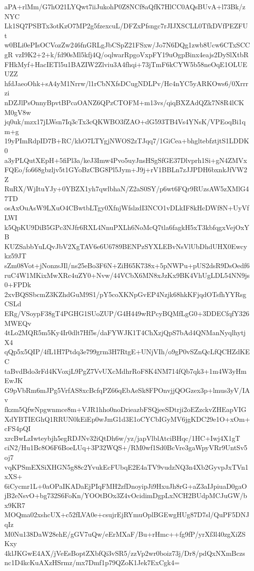 aPA+rlMm/G7hO21LYQwt7iiJukohP0Z8NCf8aQfK7HlCC0AQsBUvA+l73Bk/zNYC
Lk1SQ7PSBTx3otKzO7MP2g5fzexcuL/DFZxPfsngc7rJIJXSCLL0TfkDVfPEZFUt
w0BLi0ePIsOCVozZw246fnGRLgJbCSpZ21FSxw/Jo7N6DQg1zwb8Ucw6CTxSCCgR
vzI9K2+2+k/fd90sMl5kfj4Q/oqlwarRpgoVxpFY19uOgpBinx4eajs2DySlXtbR
FHkMyf+HacIETl5u1BAZIW2Zlviu3A4fhqi+73jTmF6kCYW5b58neOqE1OLUEUZZ
hfdJaeoOhk+sA4yM1Nrrw/l1rCbNXfsDCugNDLPv/Hc4nYC5yARKOws6/0Xrrrzi
nDZJlPsOnnyBpvtBPcaOANZ6QPzCTOFM+m13vs/qiqBXZAdQZk7N8R4lCKM0gV8w
jq0uk/mzx17jLWsn7Iq3cTx3cQKWBO3fZAO+dG593TB4Vs4YNsK/VPEoqBi1qm+g
19yPImRdpID7B+RC/khO7LTYgjNWOS2zTJqq7/1GiCea+bhgltebfztjtS1LDDK0
a3yPLQutXEpH+5fiPl3a/keJ3Imw4Pvo5uyJnsHSgSfGE37Dlvprh1Si+gN4ZMVx
FQEo/fo668gbzljv5t1GYoBzCBG8Pl5Jym+J9j+rV1BBLn7zJJPDH6bxnkJfVW2Z
RuRX/WjItuYJy+0YBZX1yh7qwlbhaN/Z2aS0SY/p6wt6FQr9RUzsAW5zXMlG47TD
osAxOuAsW9LXuO4CBwtbLTgy0XfnjWfslzdI3NCO1vDLkIF8kHcDWf8N+UyVfLWI
k5QpKU9DiB5GPc3NJfr6RXL4NnuPXLh6NoMcQ7tla6fagkH5xT3kbfqgxVejOxYB
KUZSabbYuLQvJbV2XgTAV6e6U6789BENPzSYXLEBvNsVlUbDhdUHX0Ewcykz59JT
sZm08Vot+jNonzsJIl/ns25eBo3F6N+ZiH65K738x+5pNWPu+pUS2dsR9DsOedf6
ruC4W1MKixMwXRc4uZY0+Nvw/44VCbX6MN8xJzKx9BK4VhUgLDL54NN9js0+FPDk
2xvBQSSbcmZ3KZhdGuM9S1/pY5coXKNpGvEP4Nzjk68hkKFjqdOTsfhYYRsgCSLd
ERg/VSoypF38gT4PGHG1SUoZUP/G4H449wRPcyBQMfLgG0+3DDECfqfY326MWEQv
4tLo2MQR5m5Ky4Ir0dlt7Hf5s/daFYWJK1T4ChXzjQpS7bAd4QNManNyqlhytjX4
qQp5x5QIP/4fL1H7Ptdq3e799grm3H7RtgE+UNjVIh/o9gP0vSZnQcLfQCHZdKEC
taBvdBdo3rFd4KVoxjL9PgZ7VvUXcMdhrRoF8K4NM714fQb7qk3+1m4W3yHmEwJK
G9pVbRm6mJPg5VrfAS8xcBcfqPZ66qEbAeSk8FPOnvjjQOGzex3p+lmus3yV/IAv
fkzm5QfwNpgwnmce8m+VJR1hho0noDrieazbFSQjeeSDtrji2oEZzckvZHEapVIG
XdYBTIEGhQ1RRUN0kEiEp0wJmG1d3E1oCYCbIGyMV6jgKDC29e1O+xOm+cFS4pQI
xrcBwLzIwteybjh5egRDJNv32iQtDh6w/yz/japVlblAtciBHqc/1HC+Iwj4X1gT
ciN2/Hu1Bc8O6F6BoeLUq+3P32WQS+/RM0wf1Sd0BcVre3gaWpyVRr9UntSv5oj7
vqKPSmEXSiXHGN5g88c2YvukEcFUbqE2E4aTV9vudzNQ3n4Xb2GyvpJxTVn1xXS+
6iCycmr1L+0aOPaIKADaEjPIqFMH2zfDnoyipJi9HxuJh8rG+aZ3aIJpiuaD0gaO
jB2eNsvO+bg732S6FoKn/YOOtBOx3Z4vOcidimDgpLxNCH2BUdpMCJuGW/bx9KR7
MOQma02xshcUX+c52fLVA0e+csujrEjRYmuOplBGEwgHUg87D7sl/QuPF5DNJqIz
M0Nu138DaW28ehE/gGV7uQw/eErMXaF/Bu+rHmc++fg9fP/yrXf3l40zgXiZSKxy
4klJKGwE4AX/jVeEsBoptZXbfQi3vSR5/zzVp2wr0boiz73j/Dr8/pdQxNXmBczs
nc1D4kcKuAXzHSrmz/mx7Dmf1p79QZoK1Jek7ExCgk4=
